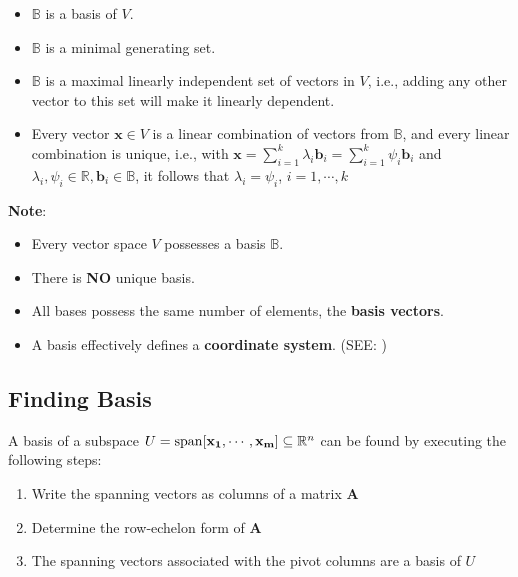 \begin{itemize}
    \item $\mathbb{B}$ is a basis of $V$.
    
    \item $\mathbb{B}$ is a minimal generating set.
    
    \item $\mathbb{B}$ is a maximal linearly independent set of vectors in $V$, i.e., adding any other vector to this set will make it linearly dependent.

    \item Every vector $\mathbf{x} \in V$ is a linear combination of vectors from $\mathbb{B}$, and every linear combination is unique, i.e., with \( \displaystyle \mathbf{x} = \sum_{i=1}^{k} \lambda_i \mathbf{b}_i = \sum_{i=1}^{k} \psi_i \mathbf{b}_i \) and $\lambda_i, \psi_i \in \mathbb{R}, \mathbf{b}_i \in \mathbb{B}$, it follows that $\lambda_i = \psi_i$, $i=1,\cdots,k$

    
\end{itemize}

\vspace{0.2cm}
\textbf{Note}:
\begin{itemize}
    \item Every vector space $V$ possesses a basis $\mathbb{B}$. 
    
    \item There is \textbf{NO} unique basis. 
    
    \item All bases possess the same number of elements, the \textbf{basis vectors}.

    \item A basis effectively defines a \textbf{coordinate system}. (SEE: )
\end{itemize}

\subsection{Finding Basis \cite{mfml-1}}
A basis of a subspace $U = \operatorname{span}[\mathbf{x_1, \cdots, x_m}] \subseteq \mathbb{R}^n$ can be found by executing the following steps:
\begin{enumerate}
    \item Write the spanning vectors as columns of a matrix $\mathbf{A}$
    \item Determine the row-echelon form of $\mathbf{A}$
    \item The spanning vectors associated with the pivot columns are a basis of $U$
\end{enumerate}


